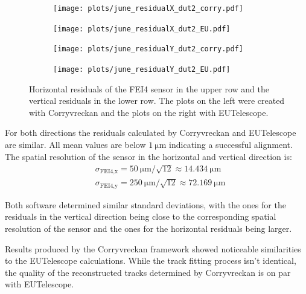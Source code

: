 \begin{figure}
  \hspace{-2.5cm}
  \begin{subfigure}{0.62\textwidth}
      \texttt{[image: plots/june\_residualX\_dut2\_corry.pdf]}
  \end{subfigure}
  \begin{subfigure}{0.62\textwidth}
      \hspace{0.95cm}
      \texttt{[image: plots/june\_residualX\_dut2\_EU.pdf]}
  \end{subfigure}
  \begin{subfigure}{0.62\textwidth}
    \hspace{-2.5cm}
      \texttt{[image: plots/june\_residualY\_dut2\_corry.pdf]}
  \end{subfigure}
  \begin{subfigure}{0.62\textwidth}
    \hspace{-2.5cm}
      \hspace{0.95cm}
      \texttt{[image: plots/june\_residualY\_dut2\_EU.pdf]}
  \end{subfigure}
  \caption{Horizontal residuals of the FEI4 sensor in the upper row and the vertical residuals in the lower row. The plots on the left
  were created with Corryvreckan and the plots on the right with EUTelescope.}
  \label{fig:residual_dut}
\end{figure}

For both directions the residuals calculated by Corryvreckan and EUTelescope are similar. All mean values are below $\SI{1}{\micro\meter}$
indicating a successful alignment. The spatial resolution of the sensor in the horizontal and vertical direction is:
\begin{align*}
  &\sigma_{\text{FEI4},\text{x}} = \SI{50}{\micro\meter}/\sqrt{12} \approx \SI{14.434}{\micro\meter} \\
  &\sigma_{\text{FEI4},\text{y}} = \SI{250}{\micro\meter}/\sqrt{12} \approx \SI{72.169}{\micro\meter}
\end{align*}

Both software determined similar standard deviations, with the ones for the residuals in the vertical direction being close to
the corresponding spatial resolution of the sensor and the ones for the horizontal residuals being larger.


Results produced by the Corryvreckan framework showed noticeable similarities to the EUTelescope calculations. While the track
fitting process isn't identical, the quality of the reconstructed tracks determined by Corryvreckan is on par with EUTelescope.
